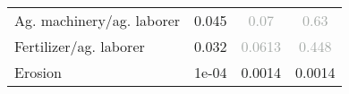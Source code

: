 \documentclass[border=1mm, preview]{standalone}
\begin{document}
\begin{table}[H]
\begin{tabular}{llll}
Ag. machinery/ag. laborer & \multicolumn{1}{c}{\textcolor[HTML]{181a19}{0.045}} & \multicolumn{1}{c}{\textcolor[HTML]{a6aba8}{0.07}} & \multicolumn{1}{c}{\textcolor[HTML]{a6aba8}{0.63}}\\
Fertilizer/ag. laborer & \multicolumn{1}{c}{\textcolor[HTML]{181a19}{0.032}} & \multicolumn{1}{c}{\textcolor[HTML]{a6aba8}{0.0613}} & \multicolumn{1}{c}{\textcolor[HTML]{a6aba8}{0.448}}\\
Erosion & \multicolumn{1}{c}{\textcolor[HTML]{181a19}{1e-04}} & \multicolumn{1}{c}{\textcolor[HTML]{181a19}{0.0014}} & \multicolumn{1}{c}{\textcolor[HTML]{181a19}{0.0014}}\\
\bottomrule
\end{tabular}
\end{table}
\end{document}
